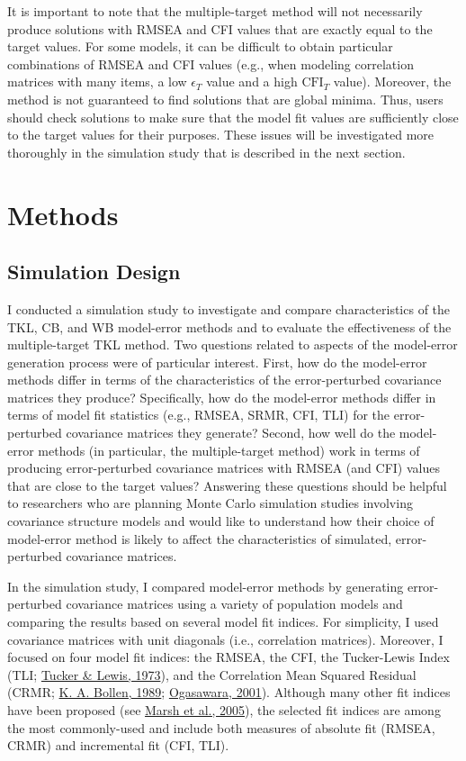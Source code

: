 \documentclass[11pt]{umnthesis}
\begin{document}
It is important to note that the multiple-target method will not necessarily produce solutions with RMSEA and CFI values that are exactly equal to the target values. For some models, it can be difficult to obtain particular combinations of RMSEA and CFI values (e.g., when modeling correlation matrices with many items, a low \(\epsilon_T\) value and a high \(\textrm{CFI}_T\) value). Moreover, the method is not guaranteed to find solutions that are global minima. Thus, users should check solutions to make sure that the model fit values are sufficiently close to the target values for their purposes. These issues will be investigated more thoroughly in the simulation study that is described in the next section.

\hypertarget{methods}{%
\chapter{Methods}\label{methods}}

\hypertarget{simulation-design}{%
\section{Simulation Design}\label{simulation-design}}

I conducted a simulation study to investigate and compare characteristics of the TKL, CB, and WB model-error methods and to evaluate the effectiveness of the multiple-target TKL method. Two questions related to aspects of the model-error generation process were of particular interest. First, how do the model-error methods differ in terms of the characteristics of the error-perturbed covariance matrices they produce? Specifically, how do the model-error methods differ in terms of model fit statistics (e.g., RMSEA, SRMR, CFI, TLI) for the error-perturbed covariance matrices they generate? Second, how well do the model-error methods (in particular, the multiple-target method) work in terms of producing error-perturbed covariance matrices with RMSEA (and CFI) values that are close to the target values? Answering these questions should be helpful to researchers who are planning Monte Carlo simulation studies involving covariance structure models and would like to understand how their choice of model-error method is likely to affect the characteristics of simulated, error-perturbed covariance matrices.

In the simulation study, I compared model-error methods by generating error-perturbed covariance matrices using a variety of population models and comparing the results based on several model fit indices. For simplicity, I used covariance matrices with unit diagonals (i.e., correlation matrices). Moreover, I focused on four model fit indices: the RMSEA, the CFI, the Tucker-Lewis Index (TLI; \protect\hyperlink{ref-tucker1973}{Tucker \& Lewis, 1973}), and the Correlation Mean Squared Residual (CRMR; \protect\hyperlink{ref-bollen1989}{K. A. Bollen, 1989}; \protect\hyperlink{ref-ogasawara2001}{Ogasawara, 2001}). Although many other fit indices have been proposed (see \protect\hyperlink{ref-marsh2005}{Marsh et al., 2005}), the selected fit indices are among the most commonly-used and include both measures of absolute fit (RMSEA, CRMR) and incremental fit (CFI, TLI).
\end{document}
